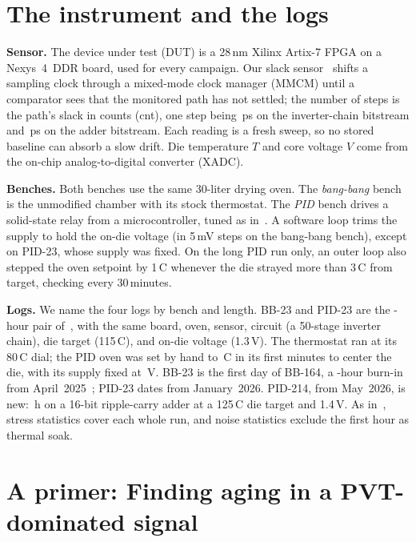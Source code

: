 \documentclass[10pt,twocolumn]{article}
\newcommand{\degC}{\,\textdegree C}
\begin{document}
\section{The instrument and the logs}

\textbf{Sensor.} The device under test (DUT) is a 28\,nm Xilinx Artix-7 FPGA on a Nexys~4~DDR board, used for every campaign. Our slack sensor~\cite{sbcci25} shifts a sampling clock through a mixed-mode clock manager (MMCM) until a comparator sees that the monitored path has not settled; the number of steps is the path's slack in counts (cnt), one step being \vPsINV\,ps on the inverter-chain bitstream and \vPsRCA\,ps on the adder bitstream. Each reading is a fresh sweep, so no stored baseline can absorb a slow drift. Die temperature $T$ and core voltage $V$ come from the on-chip analog-to-digital converter (XADC).

\textbf{Benches.} Both benches use the same 30-liter drying oven. The \emph{bang-bang} bench is the unmodified chamber with its stock thermostat. The \emph{PID} bench drives a solid-state relay from a microcontroller, tuned as in~\cite{sbcci26}. A software loop trims the supply to hold the on-die voltage (in 5\,mV steps on the bang-bang bench), except on PID-23, whose supply was fixed. On the long PID run only, an outer loop also stepped the oven setpoint by 1\degC{} whenever the die strayed more than 3\degC{} from target, checking every 30\,minutes.

\textbf{Logs.} We name the four logs by bench and length. BB-23 and PID-23 are the \vDurPair-hour pair of~\cite{sbcci26}, with the same board, oven, sensor, circuit (a 50-stage inverter chain), die target (115\degC), and on-die voltage (1.3\,V). The thermostat ran at its 80\degC{} dial; the PID oven was set by hand to \vPIDspMax\degC{} in its first minutes to center the die, with its supply fixed at \vVpsuPID\,V. BB-23 is the first day of BB-164, a \vDurBBlong-hour burn-in from April~2025~\cite{sbcci25}; PID-23 dates from January~2026. PID-214, from May~2026, is new: \vDurRCA\,h on a 16-bit ripple-carry adder at a 125\degC{} die target and 1.4\,V. As in~\cite{sbcci26}, stress statistics cover each whole run, and noise statistics exclude the first hour as thermal soak.

\section{A primer: Finding aging in a PVT-dominated signal}
\end{document}

